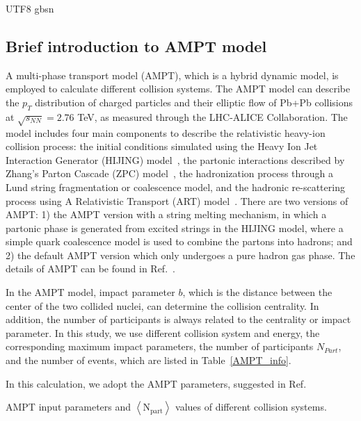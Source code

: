 \documentclass[twocolumn,showpacs,preprintnumbers,superscriptaddress,amsmath,amssymb]{revtex4}
\begin{document}
\begin{CJK*} {UTF8} {gbsn}
	\subsection{Brief introduction to AMPT model}
	A multi-phase transport model (AMPT), which is a hybrid dynamic model, is employed to calculate different collision systems.
	The AMPT model can describe the $p_{T}$ distribution of charged particles \cite{xujun,suppressionhighpt,Ye_2017,JinXH} and their elliptic flow of Pb+Pb collisions
	at $\sqrt{s_{NN}} = 2.76$ TeV, as measured through the LHC-ALICE Collaboration. The model includes four main components to describe
	the relativistic heavy-ion collision process: the initial conditions simulated using the Heavy Ion Jet Interaction Generator (HIJING) model~\cite{HIJING-1,HIJING-2}, the partonic interactions described by Zhang's Parton Cascade (ZPC) model~\cite{ZPCModel}, the hadronization process through a Lund string fragmentation or coalescence model, and the hadronic re-scattering process using A Relativistic Transport (ART) model~\cite{ARTModel}. There are two versions of AMPT: 1) the AMPT version with a string melting mechanism, in which a partonic phase is generated from excited strings in the HIJING model, where a simple quark coalescence model is used to combine the partons into hadrons; and 2) the default AMPT version which only undergoes a pure hadron gas phase. The details of AMPT can be found in Ref.~\cite{AMPT_origin}.

		In the AMPT model, impact parameter $b$, which is the distance between the center of the two collided nuclei, can determine the collision centrality. In addition, the number of participants is always related to the centrality or impact parameter. In this study, we use different collision system and energy, the corresponding maximum impact parameters, the number of participants $N_{Part}$, and the number of events, which are listed in Table~\ref{AMPT_info}.
		
		In this calculation, we adopt the AMPT parameters, suggested in Ref.~\cite{Ye_2017}
	\begin{table*}[]
\scriptsize
\centering
\caption{AMPT input parameters and $\left\langle \mathrm{N_{part}}\right\rangle$ values of different collision systems.}
\label{AMPT_info}


\end{table*}
\end{CJK*}
\end{document}
